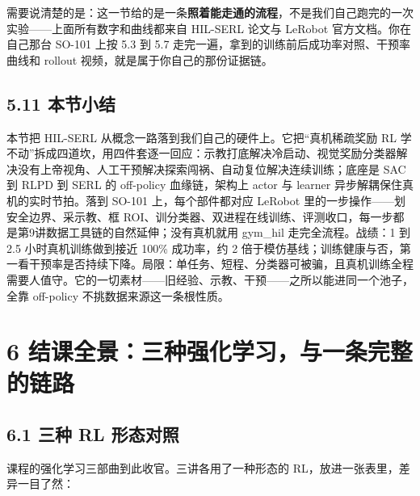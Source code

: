 \documentclass[
  chinese,
]{ctexart}
\begin{document}
需要说清楚的是：这一节给的是一条\textbf{照着能走通的流程}，不是我们自己跑完的一次实验------上面所有数字和曲线都来自
HIL-SERL 论文与 LeRobot 官方文档。你在自己那台 SO-101 上按 5.3 到 5.7
走完一遍，拿到的训练前后成功率对照、干预率曲线和 rollout
视频，就是属于你自己的那份证据链。

\subsection{5.11 本节小结}\label{ux672cux8282ux5c0fux7ed3-4}

本节把 HIL-SERL 从概念一路落到我们自己的硬件上。它把``真机稀疏奖励 RL
学不动''拆成四道坎，用四件套逐一回应：示教打底解决冷启动、视觉奖励分类器解决没有上帝视角、人工干预解决探索闯祸、自动复位解决连续训练；底座是
SAC 到 RLPD 到 SERL 的 off-policy 血缘链，架构上 actor 与 learner
异步解耦保住真机的实时节拍。落到 SO-101 上，每个部件都对应 LeRobot
里的一步操作------划安全边界、采示教、框
ROI、训分类器、双进程在线训练、评测收口，每一步都是第9讲数据工具链的自然延伸；没有真机就用
gym\_hil 走完全流程。战绩：1 到 2.5 小时真机训练做到接近 100\%
成功率，约 2
倍于模仿基线；训练健康与否，第一看干预率是否持续下降。局限：单任务、短程、分类器可被骗，且真机训练全程需要人值守。它的一切素材------旧经验、示教、干预------之所以能进同一个池子，全靠
off-policy 不挑数据来源这一条根性质。

\section{6
结课全景：三种强化学习，与一条完整的链路}\label{ux7ed3ux8bfeux5168ux666fux4e09ux79cdux5f3aux5316ux5b66ux4e60ux4e0eux4e00ux6761ux5b8cux6574ux7684ux94feux8def}

\subsection{6.1 三种 RL
形态对照}\label{ux4e09ux79cd-rl-ux5f62ux6001ux5bf9ux7167}

课程的强化学习三部曲到此收官。三讲各用了一种形态的
RL，放进一张表里，差异一目了然：
\end{document}
